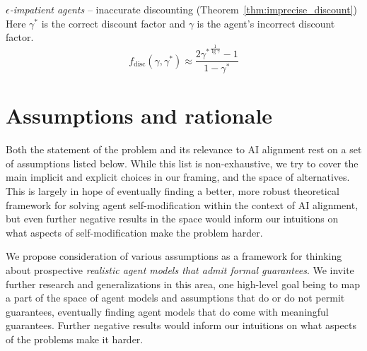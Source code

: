\smallskip
\noindent
\emph{$\epsilon$-impatient agents} -- inaccurate discounting (Theorem~\ref{thm:imprecise_discount}) Here $\gamma^*$ is the correct discount factor and $\gamma$ is the agent's incorrect discount factor.
$$f_\text{disc}(\gamma, \gamma^*) \approx \frac{2 {\gamma^*}^\frac{1}{\lg \gamma}-1}{1-\gamma^*}$$
    
\section{Assumptions and rationale}\label{sec:assumptions}

Both the statement of the problem and its relevance to AI alignment rest on a set of assumptions listed below. While this list is non-exhaustive, we try to cover the main implicit and explicit choices in our framing, and the space of alternatives. This is largely in hope of eventually finding a better, more robust theoretical framework for solving agent self-modification within the context of AI alignment, but even further negative results in the space would inform our intuitions on what aspects of self-modification make the problem harder.

\smallskip
We propose consideration of various assumptions as a framework for thinking about prospective \emph{realistic agent models that admit formal guarantees}. We invite further research and generalizations in this area, one high-level goal being to map a part of the space of agent models and assumptions that do or do not permit guarantees, eventually finding agent models that do come with meaningful guarantees. Further negative results would inform our intuitions on what aspects of the problems make it harder.

